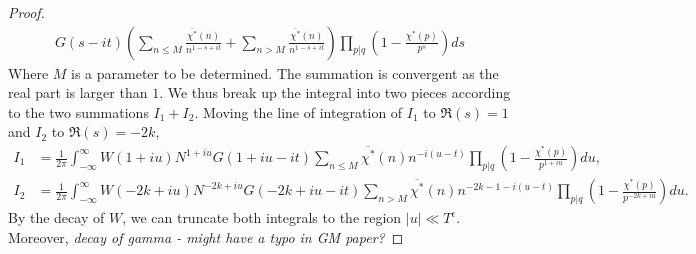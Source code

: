 \begin{proof}
\begin{align*}
    G(s-it) 
    \left(\sum_{n\leq M}\frac{\overline{\chi^*}(n)}{n^{1-s+it}}+
    \sum_{n> M}\frac{\overline{\chi^*}(n)}{n^{1-s+it}}
   \right) \prod_{p|q} \left(1-\frac{\chi^*(p)}{p^s}\right)ds
\end{align*}
Where $M$ is a parameter to be determined. The summation is convergent as the real part is larger than $1$.
We thus break up the integral into two pieces according to the two summations $I_1+I_2$. Moving the line of integration of $I_1$ to $\Re(s)=1$ and $I_2$ to $\Re(s)=-2k$,
\begin{align*}
        I_1&= \frac{1}{2\pi}\int_{-\infty}^{\infty}W(1+iu)N^{1+iu}G(1+iu-it)\sum_{n\leq M}\overline{\chi^*}(n)n^{-i(u-t)}\prod_{p|q} \left(1-\frac{\chi^*(p)}{p^{1+iu}}\right)du,\\
        I_2&= \frac{1}{2\pi}\int_{-\infty}^{\infty}W(-2k+iu)N^{-2k+iu}G(-2k+iu-it)\sum_{n> M}\overline{\chi^*}(n)n^{-2k-1-i(u-t)}\prod_{p|q} \left(1-\frac{\chi^*(p)}{p^{-2k+iu}}\right)du.
\end{align*}
By the decay of $W$, we can truncate both integrals to the region $|u|\ll T^\epsilon$.
Moreover, \textit{decay of gamma - might have a typo in GM paper?}
\end{proof}
